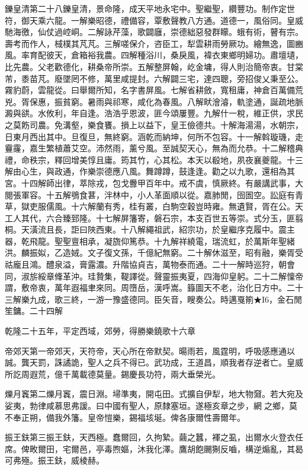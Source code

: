\begin{pinyinscope}
鑠皇清第二十八鑠皇清，景命隆，成天平地永宅中。聖繼聖，纘豐功。制作定世符，御天乘六龍。一解樂昭德，禮備容，覃敷聲教八方通。道德一，風俗同。皇威馳海徼，仙仗過崆峒。二解詠芹藻，歌闢廱，崇德絀惡發群矇。蛾有術，瞽有宗。壽考而作人，棫樸其芃芃。三解嗟保介，咨臣工，犁雲耕雨勞厥功。繪無逸，圖豳風。率育配彼天，倉箱裕我農。四解種浴川，桑戾風，褘衣東鄉明婦功。肅壇壝，比先農。父老歡德化，耕桑帝所崇。五解整屏翰，屹金墉，得人則治簡帝衷。甘棠芾，黍苗芃。廢墜罔不修，萬里咸提封。六解闢三宅，達四聰，旁招俊乂秉至公。霧豹蔚，雲龍從。曰舉爾所知，名字書屏風。七解省耕斂，寬租庸，神倉百萬備荒兇。胥保惠，振貧窮。暑雨與祁寒，咸化為春風。八解畎澮濬，軌塗通，誕疏地脈澱與谼。水攸利，年自逢。浩浩乎恩波，匪今頌屢豐。九解什一稅，維正供，求民之莫飭司農。免溝壑，樂食饔。損上以益下，皇王儉德共。十解海湯湯，水朝宗，日東月西出其中。旦復旦，無終窮。涵乾而納坤，何所不包容。十一解斡璇璣，走靊霳，嘉生繁植蕭艾空。沛然雨，薰兮風。至誠契天心，無為而允恭。十二解稽典禮，命秩宗，釋回增美惇且庸。筠其竹，心其松。本天以殽地，夙夜襄夔龍。十三解由心生，與政通，作樂崇德應八風。舞蹲蹲，鼓逢逢。勸之以九歌，還相為其宮。十四解師出律，萃除戎，包戈釁甲百年中。戒不虞，慎厥終。有嚴講武事，大閱張軍容。十五解鴞食葚，泮林中，小人革面順以從。嘉肺閒，囹圄空。訟庭有青草，獄吏服儒風。十六解蘭有秀，桂有叢，白駒空穀豈時雍。無遺賢，胥在公。天工人其代，六合臻郅隆。十七解屏籓寄，磐石宗，本支百世五等崇。式分玉，匪翦桐。天潢流且長，詎曰陜西東。十八解繩祖武，紹宗功，於皇繼序克履中。震主器，乾飛龍。聖聖亶相承，凝旒仰篤恭。十九解祥繞電，瑞流虹，於萬斯年聖緒洪。麟振姒，乙造娀。文子復文孫，千億紀無窮。二十解休滋至，昭有融，樂胥受祜龐且鴻。醴泉溢，膏露濃。升階協貞吉，萬物泰而通。二十一解時巡狩，朝會同，淑旂綏章鞗革沖。珪贄集，鞮譯從。聲靈振夷夏，四海仰皇躬。二十二解懍帝謂，敷帝衷，萬年遐福聿來同。周嶞岳，漢呼嵩。籙圖天不老，治化日方中。二十三解樂九成，歌三終，一游一豫盛德同。臣矢音，瞍奏公。時邁戛箾★I6，金石閒笙鏞。二十四解

乾隆二十五年，平定西域，郊勞，得勝樂鐃歌十六章

帝郊天第一帝郊天，天符帝，天心所在帝默契。暘雨若，風霆明，呼吸感應通以誠。龔天罰，誅譎詭，聖人之兵不得已。武功成，王道昌，順我者存逆者亡。皇威所訖周遐荒，億千萬載德莫量。錫慶長功符，兩大垂榮光。

爍月竁第二爍月竁，震日淵。埽準夷，開屯田。式擴自伊犁，地大物奫。若大宛及娑夷，勃律咸慕思弗諼。曰中國有聖人，原隸塞垣。遂極亥章之步，網之鄉，莫不奉正朔，備我外籓。皇帝愷樂，錫福垓埏。俾各康爾性壽爾年。

振王鈇第三振王鈇，天西極。蠢爾回，久拘縶。繭之蠶，褌之虱，出爾水火登衣任席。俾畋爾田，宅爾邑，亭毒煦嫗，沐我化澤。鷹胡飽颺猘反嚙，構逆煽亂，其曷可弗殛。振王鈇，威棱赫。


\end{pinyinscope}
